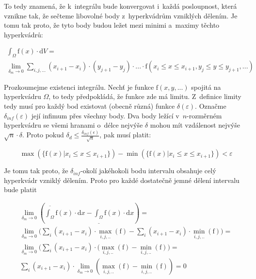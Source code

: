 To tedy znamená, že k~integrálu bude konvergovat i~každá posloupnost, která vznikne tak, že sečteme libovolné body z~hyperkvádrům vzniklých dělením. Je tomu tak proto, že tyto body budou ležet mezi minimi a~maximy těchto hyperkvádrů:

\begin{equation}
\label{eq:vypocet_vycerozmerneho_integralu}
\begin{split}
\int_{\Omega} \mathrm{f}(x) \cdot \mathrm{d}V = \\
\lim_{\delta_m \to 0} \sum_{i,j,...} (x_{i+1} - x_i) \cdot (y_{j+1} - y_j) \cdot ... \cdot \mathrm{f}(x_i \leq x \leq x_{i+1}, y_j \leq y \leq y_{j+1}, ...)
\end{split}
\end{equation}

Prozkoumejme existenci integrálu. Nechť je funkce \(\mathrm{f}(x, y, ...)\) spojitá na hyperkvádru \(\Omega\), to tedy předpokládá, že funkce zde má limitu. Z~definice limity tedy musí pro každý bod existovat (obecně různá) funkce \(\delta(\varepsilon)\). Označme \(\delta_{inf}(\varepsilon)\) její infimum přes všechny body. Dva body ležící v~\(n\)-rozměrném hyperkvádru se všemi hranami o~délce nejvýše \(\delta\) mohou mít vzdálenost nejvýše \(\sqrt{n} \cdot \delta\). Proto pokud \(\delta_d \leq \frac{\delta_{inf}(\epsilon)}{\sqrt{n}}\), pak musí platit: 

\begin{equation}
\max(\{\mathrm{f}(x) | x_i \leq x \leq x_{i+1}\}) - \min(\{\mathrm{f}(x) | x_i \leq x \leq x_{i+1}\}) < \varepsilon
\end{equation}

Je tomu tak proto, že \(\delta_{inf}\)-okolí jakéhokoli bodu intervalu obsahuje celý hyperkvádr vzniklý dělením. Proto pro každé dostatečně jemné dělení intervalu bude platit

\begin{equation}
\begin{split}
\lim_{\delta_m \to 0} \left( \overline{\int_{\Omega}} \mathrm{f}(x) \cdot \mathrm{d}x - \underline{\int_{\Omega}} \mathrm{f}(x) \cdot \mathrm{d}x \right) = \\
\lim_{\delta_m \to 0} \Bigg( \sum_{i} (x_{i+1} - x_i) \cdot \max_{i, j, ..}(\mathrm{f}) -
\sum_{i} (x_{i+1} - x_i) \cdot \min_{i, j, ..}(\mathrm{f}) \Bigg) = \\
\lim_{\delta_m \to 0} \Bigg( \sum_{i} (x_{i+1} - x_i) \cdot (\max_{i, j, ..}(\mathrm{f}) -
\min_{i, j, ..}(\mathrm{f}) \Bigg) = \\
\sum_{i} (x_{i+1} - x_i) \cdot \lim_{\delta_m \to 0} (\max_{i, j, ..}(\mathrm{f}) -
\min_{i, j, ..}(\mathrm{f})) = 0
\end{split}
\end{equation}

